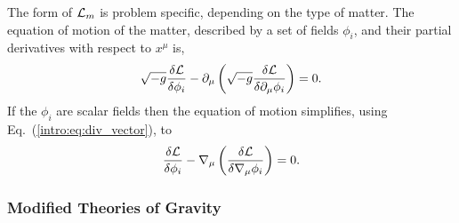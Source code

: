 The form of $\mathcal{L}_m$ is problem specific, depending on the type of matter. The equation of motion of the matter, described by a set of fields $\phi_i$, and their partial derivatives with respect to $x^\mu$ is,
\begin{equation}
\sqrt{-g}\frac{\delta \mathcal{L}}{\delta \phi_i} -\partial_\mu \left(\sqrt{-g}\frac{\delta\mathcal{L}}{\delta \partial_\mu \phi_i}\right)=0.
\end{equation}
If the $\phi_i$ are scalar fields then the equation of motion simplifies, using Eq.~(\ref{intro:eq:div_vector}), to 
\begin{equation}
\frac{\delta \mathcal{L}}{\delta \phi_i} - \nabla_\mu \left(\frac{\delta\mathcal{L}}{\delta \nabla_\mu \phi_i}\right)=0.
\end{equation}

\subsubsection*{Modified Theories of Gravity}




